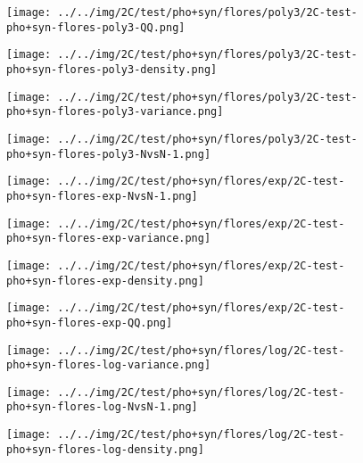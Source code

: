 \begin{figure}[H]
\centering	\texttt{[image: ../../img/2C/test/pho+syn/flores/poly3/2C-test-pho+syn-flores-poly3-QQ.png]}
\end{figure}
\begin{figure}[H]
\centering	\texttt{[image: ../../img/2C/test/pho+syn/flores/poly3/2C-test-pho+syn-flores-poly3-density.png]}
\end{figure}
\begin{figure}[H]
\centering	\texttt{[image: ../../img/2C/test/pho+syn/flores/poly3/2C-test-pho+syn-flores-poly3-variance.png]}
\end{figure}
\begin{figure}[H]
\centering	\texttt{[image: ../../img/2C/test/pho+syn/flores/poly3/2C-test-pho+syn-flores-poly3-NvsN-1.png]}
\end{figure}
\begin{figure}[H]
\centering	\texttt{[image: ../../img/2C/test/pho+syn/flores/exp/2C-test-pho+syn-flores-exp-NvsN-1.png]}
\end{figure}
\begin{figure}[H]
\centering	\texttt{[image: ../../img/2C/test/pho+syn/flores/exp/2C-test-pho+syn-flores-exp-variance.png]}
\end{figure}
\begin{figure}[H]
\centering	\texttt{[image: ../../img/2C/test/pho+syn/flores/exp/2C-test-pho+syn-flores-exp-density.png]}
\end{figure}
\begin{figure}[H]
\centering	\texttt{[image: ../../img/2C/test/pho+syn/flores/exp/2C-test-pho+syn-flores-exp-QQ.png]}
\end{figure}
\begin{figure}[H]
\centering	\texttt{[image: ../../img/2C/test/pho+syn/flores/log/2C-test-pho+syn-flores-log-variance.png]}
\end{figure}
\begin{figure}[H]
\centering	\texttt{[image: ../../img/2C/test/pho+syn/flores/log/2C-test-pho+syn-flores-log-NvsN-1.png]}
\end{figure}
\begin{figure}[H]
\centering	\texttt{[image: ../../img/2C/test/pho+syn/flores/log/2C-test-pho+syn-flores-log-density.png]}
\end{figure}

